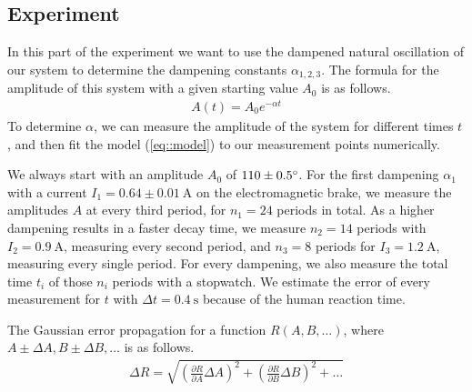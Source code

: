 \subsection{Experiment}
\label{sec::exp}
In this part of the experiment we want to use the dampened natural oscillation of our system to determine the dampening constants $\alpha_{1, 2, 3}$.
The formula for the amplitude of this system with a given starting value $A_0$ is  as follows.
\begin{align}
	A(t) = A_0 e^{-\alpha t}
	\label{eq::model}
\end{align} 
To determine $\alpha$, we can measure the amplitude of the system for different times $t$, and then fit the model (\ref{eq::model}) to our measurement points numerically.

We always start with an amplitude $A_0$ of $110 \pm 0.5 \degree$.
For the first dampening $\alpha_1$ with a current $I_1 = 0.64 \pm \SI{0.01}{\ampere}$ on the electromagnetic brake, we measure the amplitudes $A$ at every third period, for $n_1 = 24$ periods in total.
As a higher dampening results in a faster decay time, we measure $n_2 = 14$ periods with $I_2 = \SI{0.9}{\ampere}$, measuring every second period, and $n_3 = 8$ periods for $I_3 = \SI{1.2}{\ampere}$, measuring every single period.
For every dampening, we also measure the total time $t_i$ of those $n_i$ periods with a stopwatch. We estimate the error of every measurement for $t$ with $\Delta t = \SI{0.4}{\second}$ because of the human reaction time.


The Gaussian error propagation for a function $R(A, B, \dots)$, where $A \pm \Delta A, B \pm \Delta B, \dots$ is as follows.
\begin{align}
	\Delta R = \sqrt{\left(\frac{\partial R}{\partial A} \Delta A\right)^2 + \left(\frac{\partial R}{\partial B} \Delta B\right)^2 + \dots}
	\label{eq::gauss}
\end{align}
